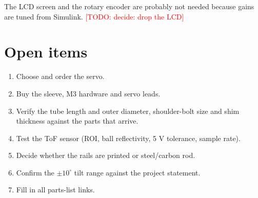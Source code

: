 \documentclass[11pt]{article}
\newcommand{\todo}[1]{\textcolor{red}{[TODO: #1]}}
\newcommand{\todo}[1]{\textcolor{red}{[TODO: #1]}}
\begin{document}
The LCD screen and the rotary encoder are probably not needed because gains are tuned from Simulink. \todo{decide: drop the LCD}
\section{Open items}
\label{sec:org5e6ec48}
\begin{enumerate}
\item Choose and order the servo.
\item Buy the sleeve, M3 hardware and servo leads.
\item Verify the tube length and outer diameter, shoulder-bolt size and shim thickness against the parts that arrive.
\item Test the ToF sensor (ROI, ball reflectivity, 5 V tolerance, sample rate).
\item Decide whether the rails are printed or steel/carbon rod.
\item Confirm the \(\pm 10^\circ\) tilt range against the project statement.
\item Fill in all parts-list links.
\end{enumerate}
\end{document}

